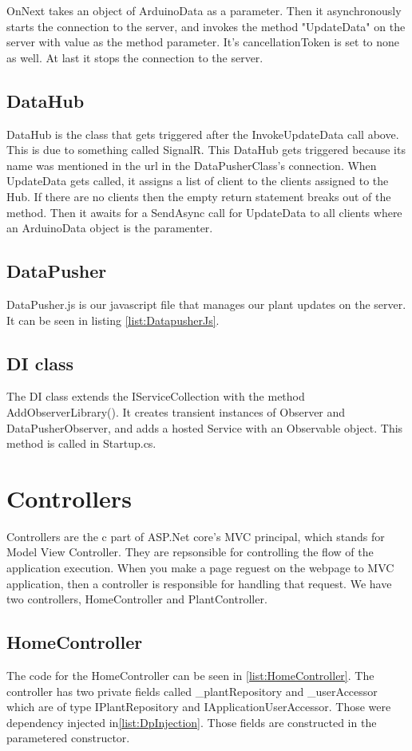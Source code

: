 \documentclass[a4paper,12pt,twoside,openright,titlepage]{book}
\begin{document}
OnNext takes an object of ArduinoData as a parameter. Then it asynchronously starts the connection to the server, and invokes the method "UpdateData" on the server with value as the method parameter. It's cancellationToken is set to none as well. At last it stops the connection to the server. 

\subsection{DataHub}
DataHub is the class that gets triggered after the InvokeUpdateData call above. This is due to something called SignalR. This DataHub gets triggered because its name was mentioned in the url in the DataPusherClass's connection. When UpdateData gets called, it assigns a list of client to the clients assigned to the Hub. If there are no clients then the empty return statement breaks out of the method. Then it awaits for a SendAsync call for UpdateData to all clients where an ArduinoData object is the paramenter.

\subsection{DataPusher}
DataPusher.js is our javascript file that manages our plant updates on the server. It can be seen in listing \ref{list:DatapusherJs}.

\subsection{DI class}
The DI class extends the IServiceCollection with the method AddObserverLibrary(). It creates transient instances of Observer and DataPusherObserver, and adds a hosted Service with an Observable object. This method is called in Startup.cs.


\section{Controllers}
Controllers are the c part of ASP.Net core's MVC principal, which stands for Model View Controller. They are repsonsible for controlling the flow of the application execution. When you make a page reguest on the webpage to MVC application, then a controller is responsible for handling that request. We have two controllers,  HomeController and PlantController.
\subsection{HomeController}
The code for the HomeController can be seen in \ref{list:HomeController}. The controller has two private fields called \_plantRepository and \_userAccessor which are of type IPlantRepository and IApplicationUserAccessor. Those were dependency injected in\ref{list:DpInjection}. Those fields are constructed in the parametered constructor. 
\end{document}

